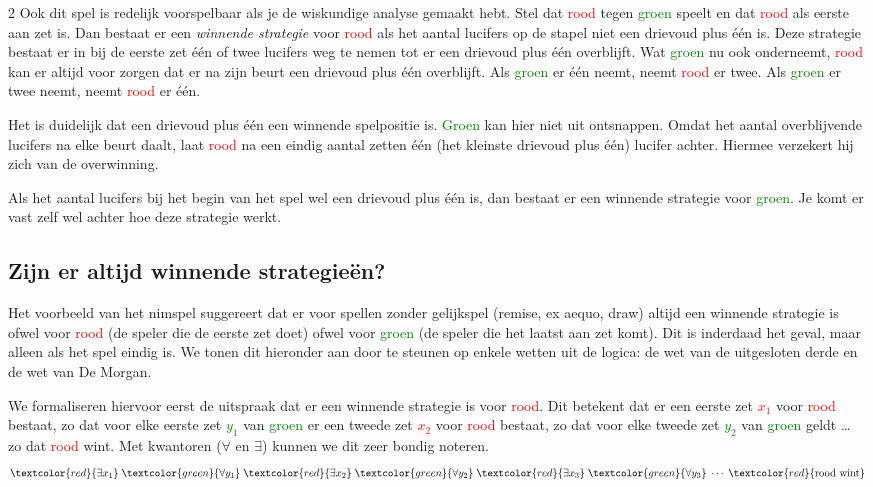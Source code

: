 \begin{multicols}{2}
Ook dit spel is redelijk voorspelbaar als je de wiskundige analyse gemaakt hebt. Stel dat \textcolor{red}{rood} tegen \textcolor{green}{groen} speelt en dat \textcolor{red}{rood} als eerste aan zet is. Dan bestaat er een \emph{winnende strategie} voor \textcolor{red}{rood} als het aantal lucifers op de stapel niet een drievoud plus één is. Deze strategie bestaat er in bij de eerste zet één of twee lucifers weg te nemen tot er een drievoud plus één overblijft. Wat \textcolor{green}{groen} nu ook onderneemt,  \textcolor{red}{rood} kan er altijd voor zorgen dat er na zijn beurt een drievoud plus één overblijft. Als \textcolor{green}{groen} er één neemt, neemt \textcolor{red}{rood} er twee. Als \textcolor{green}{groen} er twee neemt, neemt \textcolor{red}{rood} er één. 

Het is duidelijk dat een drievoud plus één een winnende spelpositie is. \textcolor{green}{Groen} kan hier niet uit ontsnappen. Omdat het aantal overblijvende lucifers na elke beurt daalt, laat \textcolor{red}{rood} na een eindig aantal zetten één (het kleinste drievoud plus één) lucifer achter. Hiermee verzekert hij zich van de overwinning.

Als het aantal lucifers bij het begin van het spel wel een drievoud plus één is, dan bestaat er een winnende strategie voor \textcolor{green}{groen}. Je komt er vast zelf wel achter hoe deze strategie werkt.


\subsection*{Zijn er altijd winnende strategieën?}
Het voorbeeld van het nimspel suggereert dat er voor spellen zonder gelijkspel (remise, ex aequo, draw)  altijd een winnende strategie is ofwel voor \textcolor{red}{rood} (de speler die de eerste zet doet) ofwel voor \textcolor{green}{groen} (de speler die het laatst aan zet komt). Dit is inderdaad het geval, maar alleen als het spel eindig is. We tonen dit hieronder aan door te steunen op enkele wetten uit de logica: de wet van de uitgesloten derde en de wet van De Morgan. 

We formaliseren hiervoor eerst de uitspraak dat er een winnende strategie is voor \textcolor{red}{rood}. Dit betekent dat er een eerste zet \textcolor{red}{$x_1$} voor \textcolor{red}{rood} bestaat, zo dat voor elke eerste zet \textcolor{green}{$y_1$}  van \textcolor{green}{groen} er een tweede zet \textcolor{red}{$x_2$} voor \textcolor{red}{rood} bestaat, zo dat voor elke tweede zet \textcolor{green}{$y_2$} van \textcolor{green}{groen} geldt … zo dat \textcolor{red}{rood} wint. Met kwantoren ($\forall$ en $\exists$) kunnen we dit zeer bondig noteren.
\[ \textcolor{red}{\exists x_1} \; \textcolor{green}{\forall y_1} \; \textcolor{red}{\exists x_2} \; \textcolor{green}{\forall y_2}  \;  \textcolor{red}{\exists x_3} \; \textcolor{green}{\forall y_3} \;\cdots \;  \textcolor{red}{\textrm{rood wint}}\]


\end{multicols}
